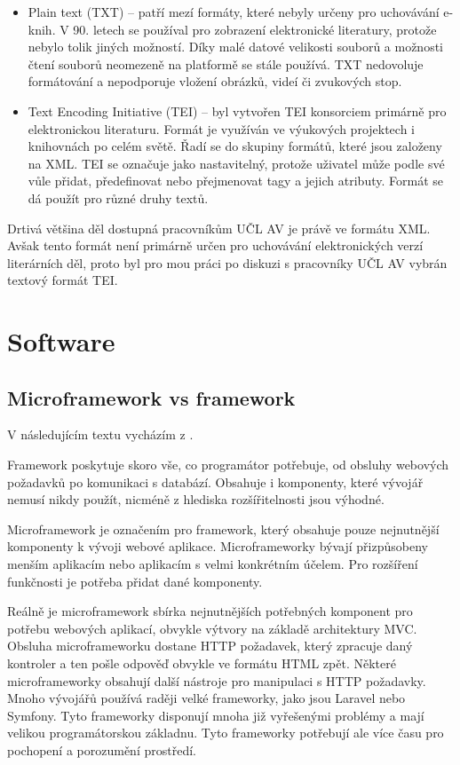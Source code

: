 \begin{itemize}
                \item Plain text (TXT) – patří mezí formáty, které nebyly určeny pro uchovávání e-knih. V 90. letech se používal pro zobrazení elektronické literatury, protože nebylo tolik jiných možností. Díky malé datové velikosti souborů a možnosti čtení souborů neomezeně na platformě se stále používá. TXT nedovoluje formátování a nepodporuje vložení obrázků, videí či zvukových stop.
                
                \item Text Encoding Initiative (TEI) – byl vytvořen TEI konsorciem primárně pro elektronickou literaturu. Formát je využíván ve výukových projektech i knihovnách po celém světě. Řadí se do skupiny formátů, které jsou založeny na XML. TEI se označuje jako nastavitelný, protože uživatel může podle své vůle přidat, předefinovat nebo přejmenovat tagy a jejich atributy. Formát se dá použít pro různé druhy textů.
            \end{itemize}
            
            Drtivá většina děl dostupná pracovníkům UČL AV je právě ve formátu XML. Avšak tento formát není primárně určen pro uchovávání elektronických verzí literárních děl, proto byl pro mou práci po diskuzi s pracovníky UČL AV vybrán textový formát TEI.
    \section{Software}
        \subsection{Microframework vs framework}
            V následujícím textu vycházím z \cite{microframework-vs-framework}.
            
            Framework poskytuje skoro vše, co programátor potřebuje, od obsluhy webových požadavků po komunikaci s databází. Obsahuje i komponenty, které vývojář nemusí nikdy použít, nicméně z hlediska rozšířitelnosti jsou výhodné.
            
            Microframework je označením pro framework, který obsahuje pouze nejnutnější komponenty k vývoji webové aplikace. Microframeworky bývají přizpůsobeny menším aplikacím nebo aplikacím s velmi konkrétním účelem. Pro rozšíření funkčnosti je potřeba přidat dané komponenty.
            
            Reálně je microframework sbírka nejnutnějších potřebných komponent pro potřebu webových aplikací, obvykle výtvory na základě architektury MVC. Obsluha microframeworku dostane HTTP požadavek, který zpracuje daný kontroler a ten pošle odpověď obvykle ve formátu HTML zpět. Některé microframeworky obsahují další nástroje pro manipulaci s HTTP požadavky. Mnoho vývojářů používá raději velké frameworky, jako jsou Laravel nebo Symfony. Tyto frameworky disponují mnoha již vyřešenými problémy a mají velikou programátorskou základnu. Tyto frameworky potřebují ale více času pro pochopení a porozumění prostředí. 
            
